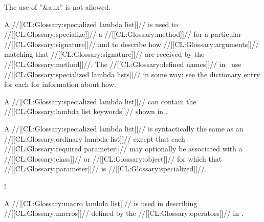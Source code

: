 The use of ''&aux'' is not allowed. 
\endlist

\endsubSection%

\goodbreak
{}

A //[[CL:Glossary:specialized lambda list]]// is used to //[[CL:Glossary:specialize]]// a //[[CL:Glossary:method]]//
for a particular //[[CL:Glossary:signature]]// and to describe how //[[CL:Glossary:arguments]]// matching
that //[[CL:Glossary:signature]]// are received by the //[[CL:Glossary:method]]//.  
The //[[CL:Glossary:defined names]]// in \thenextfigure\ use //[[CL:Glossary:specialized lambda lists]]//
in some way; see the dictionary entry for each for information about how.





A //[[CL:Glossary:specialized lambda list]]// can contain the //[[CL:Glossary:lambda list keywords]]// shown
in \thenextfigure.


A //[[CL:Glossary:specialized lambda list]]// is syntactically the same as an //[[CL:Glossary:ordinary lambda list]]//
except that each //[[CL:Glossary:required parameter]]// may optionally be associated with a //[[CL:Glossary:class]]//
or //[[CL:Glossary:object]]// for which that //[[CL:Glossary:parameter]]// is //[[CL:Glossary:specialized]]//.

\Vskip 1pc!



\endsubSection%


A //[[CL:Glossary:macro lambda list]]// is used in describing //[[CL:Glossary:macros]]// 
defined by the //[[CL:Glossary:operators]]// in \thenextfigure.



